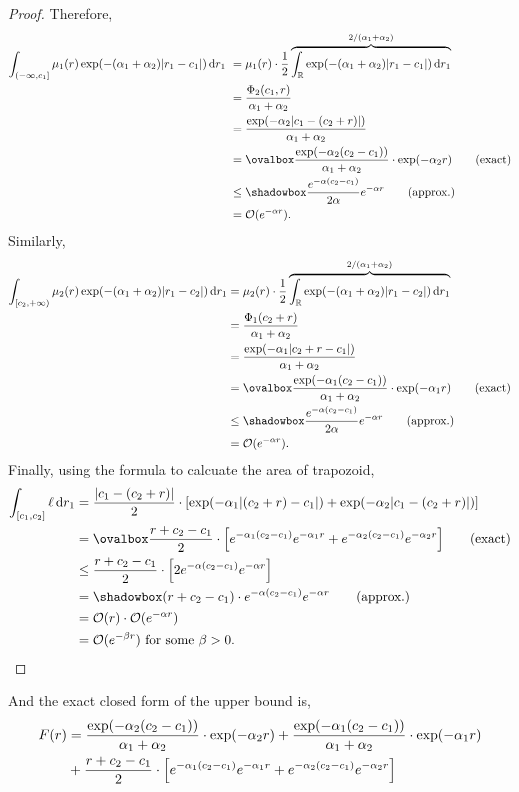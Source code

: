 \documentclass[12pt]{article}
\begin{document}
\begin{proof}
Therefore,
\begin{align*}
    \int_{(-\infty,c_1]} \mu_1(r) \exp(-(\alpha_1 + \alpha_2)|r_1 - c_1|) \dr_1 \
    &= \mu_1(r)\cdot \frac{1}{2} \overbrace{\int_{\R} \exp(-(\alpha_1 + \alpha_2)|r_1 - c_1|) \dr_1}^{2/(\alpha_1 + \alpha_2)}\\
    &= \frac{\Phi_2(c_1, r)}{\alpha_1 + \alpha_2}\\
    &= \frac{\exp(-\alpha_2|c_1 - (c_2 + r)|)}{\alpha_1 + \alpha_2}\\
    &= \movalbox{\frac{\exp(-\alpha_2(c_2-c_1))}{\alpha_1 + \alpha_2} \cdot \exp(-\alpha_2 r)} \tag{exact}\\
    & \leq \mshadowbox{\frac{e^{-\alpha(c_2 - c_1)}}{2 \alpha} e^{-\alpha r}} \tag{approx.}\\
    & = \mathcal{O}(e^{-\alpha r}).
\end{align*}
Similarly,
\begin{align*}
    \int_{[c_2,+\infty)} \mu_2(r) \exp(-(\alpha_1 + \alpha_2)|r_1 - c_2|) \dr_1
    & = \mu_2(r)  \cdot \frac{1}{2} \overbrace{\int_{\R} \exp(-(\alpha_1 + \alpha_2)|r_1 - c_2|) \dr_1}^{2/(\alpha_1 + \alpha_2)}\\
    & = \frac{\Phi_1(c_2 + r)}{\alpha_1 + \alpha_2}\\
    & = \frac{\exp(-\alpha_1|c_2 + r - c_1|)}{\alpha_1 + \alpha_2}\\
    & = \movalbox{\frac{\exp(-\alpha_1(c_2 - c_1))}{\alpha_1 + \alpha_2} \cdot \exp(-\alpha_1 r)} \tag{exact}\\
    & \leq \mshadowbox{\frac{e^{-\alpha(c_2 - c_1)}}{2 \alpha} e^{-\alpha r}} \tag{approx.} \\
    & = \mathcal{O}(e^{-\alpha r}).
\end{align*}
Finally, using the formula to calcuate the area of trapozoid,
\begin{align*}
    \int_{[c_1,c_2]} \ell \dr_1 
    &= \frac{|c_1 - (c_2 + r)|}{2} \cdot \brac{\exp(-\alpha_1|(c_2 + r) - c_1|) + \exp(-\alpha_2|c_1 - (c_2 + r)|)}\\
    &=\movalbox{\frac{r + c_2 - c_1}{2} \cdot \brac{e^{-\alpha_1(c_2 - c_1)}e^{-\alpha_1 r} + e^{-\alpha_2(c_2 - c_1)}e^{-\alpha_2 r}}} \tag{exact}\\
    &\leq \frac{r + c_2 - c_1}{2} \cdot \brac{2 e^{-\alpha(c_2 - c_1)}e^{-\alpha r}} \\
    &=\mshadowbox{(r + c_2 - c_1) \cdot e^{-\alpha(c_2 - c_1)}e^{-\alpha r}} \tag{approx.}\\
    & = \mathcal{O}(r) \cdot \mathcal{O}(e^{-\alpha r})\\
    & = \mathcal{O}(e^{-\beta r}) \text{ for some } \beta > 0.
\end{align*}
\end{proof}
And the exact closed form of the upper bound is,
\begin{align*}
    F(r) &= \frac{\exp(-\alpha_2(c_2-c_1))}{\alpha_1 + \alpha_2} \cdot \exp(-\alpha_2 r) + \frac{\exp(-\alpha_1(c_2 - c_1))}{\alpha_1 + \alpha_2} \cdot \exp(-\alpha_1 r)\\
    & +\frac{r + c_2 - c_1}{2} \cdot \left[ e^{-\alpha_1(c_2 - c_1)}e^{-\alpha_1 r} + e^{-\alpha_2(c_2 - c_1)}e^{-\alpha_2 r} \right]
\end{align*}
\end{document}

